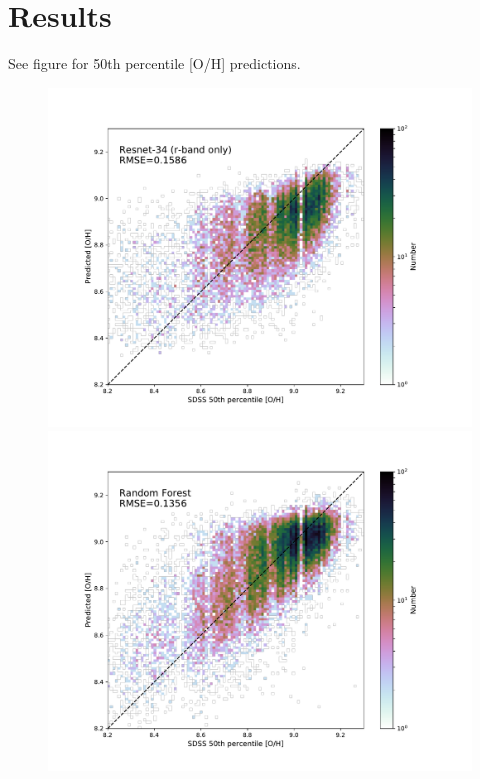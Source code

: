 \documentclass[fleqn,usenatbib]{mnras}
\begin{document}
\section{Results}\label{sec:results}

See figure for 50th percentile [O/H] predictions.





\begin{figure}
	\includegraphics[width=\columnwidth]{r-band_pred-vs-SDSS.pdf}
	\includegraphics[width=\columnwidth]{random-forest_pred-vs-SDSS.pdf}

\end{figure}
\end{document}
